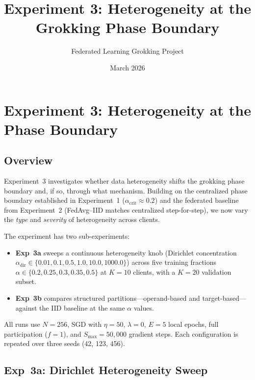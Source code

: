 \documentclass[11pt]{article}
\title{Experiment 3: Heterogeneity at the Grokking Phase Boundary}
\author{Federated Learning Grokking Project}
\date{March 2026}
\begin{document}
\maketitle

\section{Experiment 3: Heterogeneity at the Phase Boundary}
\label{sec:exp3}

\subsection{Overview}

Experiment~3 investigates whether data heterogeneity shifts the grokking phase
boundary and, if so, through what mechanism.  Building on the centralized phase
boundary established in Experiment~1 ($\alpha_{\mathrm{crit}} \approx 0.2$) and
the federated baseline from Experiment~2 (FedAvg--IID matches centralized
step-for-step), we now vary the \emph{type} and \emph{severity} of
heterogeneity across clients.

The experiment has two sub-experiments:
\begin{itemize}
  \item \textbf{Exp~3a} sweeps a continuous heterogeneity knob (Dirichlet
        concentration $\alpha_{\mathrm{dir}} \in \{0.01, 0.1, 0.5, 1.0, 10.0,
        1000.0\}$) across five training fractions
        $\alpha \in \{0.2, 0.25, 0.3, 0.35, 0.5\}$ at $K{=}10$ clients, with a
        $K{=}20$ validation subset.
  \item \textbf{Exp~3b} compares structured partitions---operand-based and
        target-based---against the IID baseline at the same $\alpha$ values.
\end{itemize}
All runs use $N{=}256$, SGD with $\eta{=}50$, $\lambda{=}0$, $E{=}5$ local
epochs, full participation ($f{=}1$), and $S_{\max}{=}50{,}000$ gradient steps.
Each configuration is repeated over three seeds (42, 123, 456).


\subsection{Exp~3a: Dirichlet Heterogeneity Sweep}
\label{sec:exp3a}
\end{document}
